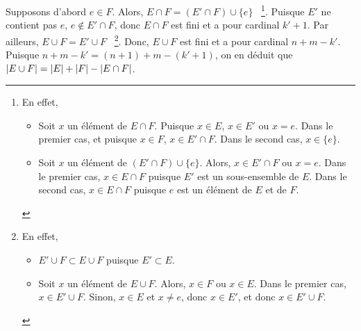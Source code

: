     Supposons d'abord $e \in F$. 
    Alors, $E \cap F = (E' \cap F) \cup \lbrace e \rbrace$%
    ~\footnote{En effet, 
        \begin{itemize}[nosep]
            \item Soit $x$ un élément de $E \cap F$. 
                Puisque $x \in E$, $x \in E'$ ou $x = e$. 
                Dans le premier cas, et puisque $x \in F$, $x \in E' \cap F$. 
                Dans le second cas, $x \in \lbrace e \rbrace$.
            \item Soit $x$ un élément de $(E' \cap F) \cup \lbrace e \rbrace$.
                Alors, $x \in E' \cap F$ ou $x = e$. 
                Dans le premier cas, $x \in E \cap F$ puisque $E'$ est un sous-ensemble de $E$.
                Dans le second cas, $x \in E \cap F$ puisque $e$ est un élément de $E$ et de $F$.
        \end{itemize}
    }.
    Puisque $E'$ ne contient pas $e$, $e \notin E' \cap F$, donc $E \cap F$ est fini et a pour cardinal $k' + 1$.
    Par ailleurs, $E \cup F = E' \cup F$%
    ~\footnote{En effet, 
        \begin{itemize}[nosep]
            \item $E' \cup F \subset E \cup F$ puisque $E' \subset E$.
            \item Soit $x$ un élément de $E \cup F$. 
                Alors, $x \in F$ ou $x \in E$.
                Dans le premier cas, $x \in E' \cup F$.
                Sinon, $x \in E$ et $x \neq e$, donc $x \in E'$, et donc $x \in E' \cup F$.
        \end{itemize}
    }.
    Donc, $E \cup F$ est fini et a pour cardinal $n + m - k'$.
    Puisque $n + m - k' = (n+1) + m - (k'+1)$, on en déduit que $\left\lvert E \cup F \right\rvert = \left\lvert E \right\rvert + \left\lvert F \right\rvert - \left\lvert E \cap F \right\rvert$.

